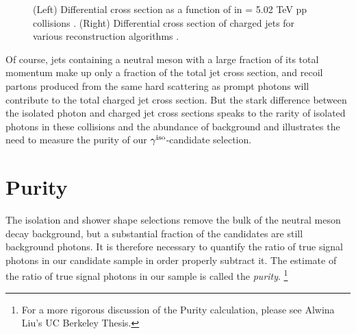 \begin{figure}[hbtp]
\caption{(Left) Differential cross section as a function of \ptgamma in \sqrts = 5.02 TeV pp collisions \cite{Acharya2019}. (Right) Differential cross section of charged jets for various reconstruction algorithms \cite{ALICECollaboration2015}.}
	\label{fig:cross_section_camparison}
\end{figure}
 
Of course, jets containing a neutral meson with a large fraction of its total momentum make up only a fraction of the total jet cross section, and recoil partons produced from the same hard scattering as prompt photons will contribute to the total charged jet cross section. But the stark difference between the isolated photon and charged jet cross sections speaks to the rarity of isolated photons in these collisions and the abundance of background and illustrates the need to measure the purity of our $\gamma^\mathrm{iso}$-candidate selection.%





\section{Purity}
\label{sec:purity}
The isolation and shower shape selections remove the bulk of the neutral meson decay background, but a substantial fraction of the \gammaiso candidates are still background photons. It is therefore necessary to quantify the ratio of true signal photons in our candidate sample in order properly subtract it. The estimate of the ratio of true signal photons in our \gammaiso sample is called the \textit{purity}. \footnote{For a more rigorous discussion of the Purity calculation, please see Alwina Liu's UC Berkeley Thesis.}

